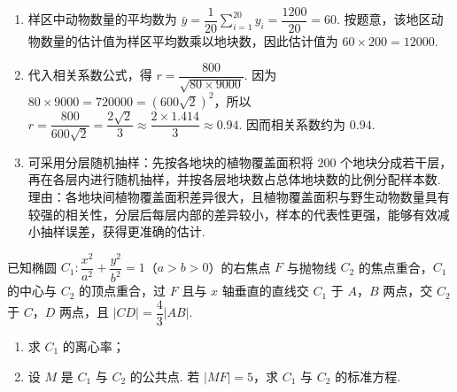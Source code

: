 \begin{solution}
\begin{enumerate}
\item 样区中动物数量的平均数为 \(\bar y=\dfrac1{20}\sum_{i=1}^{20}y_i=\dfrac{1200}{20}=60\). 按题意，该地区动物数量的估计值为样区平均数乘以地块数，因此估计值为 \(60\times200=12000\).
\item 代入相关系数公式，得 \(r=\dfrac{800}{\sqrt{80\times9000}}\). 因为 \(80\times9000=720000=(600\sqrt2)^2\)，所以 \(r=\dfrac{800}{600\sqrt2}=\dfrac{2\sqrt2}{3}\approx\dfrac{2\times1.414}{3}\approx0.94\). 因而相关系数约为 \(0.94\).
\item 可采用分层随机抽样：先按各地块的植物覆盖面积将 \(200\) 个地块分成若干层，再在各层内进行随机抽样，并按各层地块数占总体地块数的比例分配样本数. 理由：各地块间植物覆盖面积差异很大，且植物覆盖面积与野生动物数量具有较强的相关性，分层后每层内部的差异较小，样本的代表性更强，能够有效减小抽样误差，获得更准确的估计.
\end{enumerate}
\end{solution}

\begin{problem}
已知椭圆 \(C_1:\dfrac{x^2}{a^2}+\dfrac{y^2}{b^2}=1\)（\(a>b>0\)）的右焦点 \(F\) 与抛物线 \(C_2\) 的焦点重合，\(C_1\) 的中心与 \(C_2\) 的顶点重合，过 \(F\) 且与 \(x\) 轴垂直的直线交 \(C_1\) 于 \(A\)，\(B\) 两点，交 \(C_2\) 于 \(C\)，\(D\) 两点，且 \(|CD|=\dfrac{4}{3}|AB|\).

\begin{enumerate}
\item 求 \(C_1\) 的离心率；
\item 设 \(M\) 是 \(C_1\) 与 \(C_2\) 的公共点. 若 \(|MF|=5\)，求 \(C_1\) 与 \(C_2\) 的标准方程.
\end{enumerate}
\end{problem}

